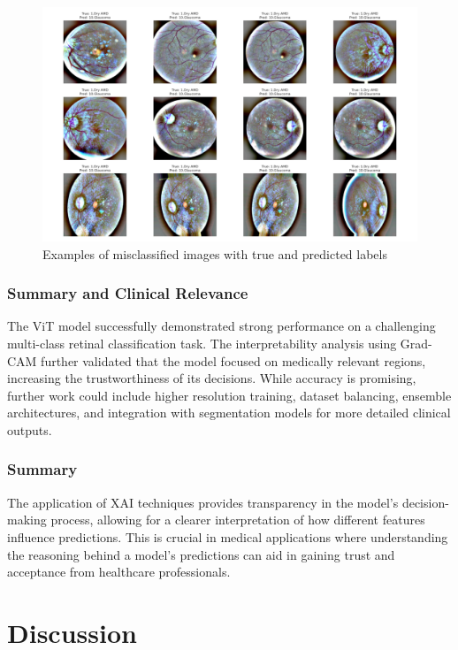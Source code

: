 \documentclass[a4paper,12pt]{report}
\begin{document}
\begin{figure}[h]
    \centering
    \includegraphics[width=\textwidth]{vit_misclassified_grid.png}
    \caption{Examples of misclassified images with true and predicted labels}
    \label{fig:misclassified}
\end{figure}

\subsection{Summary and Clinical Relevance}

The ViT model successfully demonstrated strong performance on a challenging multi-class retinal classification task. The interpretability analysis using Grad-CAM further validated that the model focused on medically relevant regions, increasing the trustworthiness of its decisions. While accuracy is promising, further work could include higher resolution training, dataset balancing, ensemble architectures, and integration with segmentation models for more detailed clinical outputs.


\subsection{Summary}

The application of XAI techniques provides transparency in the model's decision-making process, allowing for a clearer interpretation of how different features influence predictions. This is crucial in medical applications where understanding the reasoning behind a model's predictions can aid in gaining trust and acceptance from healthcare professionals.


\chapter{Discussion}
\end{document}
